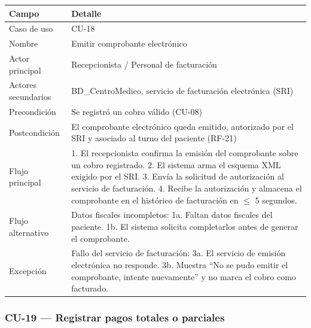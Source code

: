 \documentclass[11pt,a4paper]{article}
\begin{document}
	\begin{longtable}{p{} p{} }
		
		
		\toprule
		\textbf{Campo} &
		\textbf{Detalle}  \\
		\midrule
		\endhead
		
		Caso de uso & CU-18 \\
		Nombre & Emitir comprobante electrónico \\
		Actor principal & Recepcionista / Personal de facturación \\
		Actores secundarios & BD\_CentroMedico, servicio de facturación electrónica (SRI) \\
		Precondición & Se registró un cobro válido (CU-08) \\
		Postcondición & El comprobante electrónico queda emitido, autorizado por el SRI y asociado al turno del paciente (RF-21) \\
		Flujo principal & 1. El recepcionista confirma la emisión del comprobante sobre un cobro registrado. 2. El sistema arma el esquema XML exigido por el SRI. 3. Envía la solicitud de autorización al servicio de facturación. 4. Recibe la autorización y almacena el comprobante en el histórico de facturación en \(\leq\) 5 segundos. \\
		Flujo alternativo & Datos fiscales incompletos: 1a. Faltan datos fiscales del paciente. 1b. El sistema solicita completarlos antes de generar el comprobante. \\
		Excepción & Fallo del servicio de facturación: 3a. El servicio de emisión electrónica no responde. 3b. Muestra ``No se pudo emitir el comprobante, intente nuevamente'' y no marca el cobro como facturado. \\
		\bottomrule
	\end{longtable}
	
	\subsubsection{CU-19 --- Registrar pagos totales o parciales}
	
\end{document}
